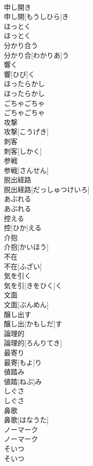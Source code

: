 \documentclass[8pt]{extreport}
\begin{document}
\begin{CJK}{UTF8}{min}
\\	申し開き	
\\	申し開[もうしひら]き	
\\	ほっとく	
\\	ほっとく	
\\	分かり合う	
\\	分かり合[わかりあ]う	
\\	響く	
\\	響[ひび]く	
\\	ほったらかし	
\\	ほったらかし	
\\	ごちゃごちゃ	
\\	ごちゃごちゃ	
\\	攻撃	
\\	攻撃[こうげき]	
\\	刺客	
\\	刺客[しかく]	
\\	参戦	
\\	参戦[さんせん]	
\\	脱出経路	
\\	脱出経路[だっしゅつけいろ]	
\\	あぶれる	
\\	あぶれる	
\\	控える	
\\	控[ひか]える	
\\	介抱	
\\	介抱[かいほう]	
\\	不在	
\\	不在[ふざい]	
\\	気を引く	
\\	気を引[きをひく]く	
\\	文面	
\\	文面[ぶんめん]	
\\	醸し出す	
\\	醸し出[かもしだ]す	
\\	論理的	
\\	論理的[ろんりてき]	
\\	最寄り	
\\	最寄[もよ]り	
\\	値踏み	
\\	値踏[ねぶ]み	
\\	しぐさ	
\\	しぐさ	
\\	鼻歌	
\\	鼻歌[はなうた]	
\\	ノーマーク	
\\	ノーマーク	
\\	そいつ	
\\	そいつ	

\end{CJK}
\end{document}
